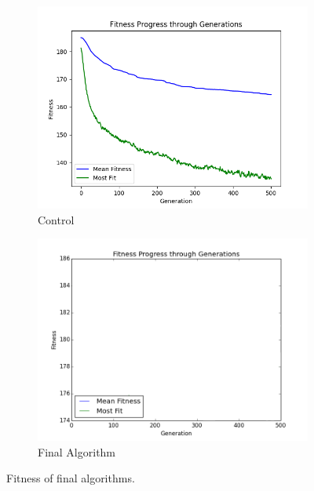 \documentclass{article}
\begin{document}
\begin{figure}[ht]
\centering
\begin{subfigure}{0.5\textwidth}
\centering
\includegraphics[width=1\textwidth]{Figures/control_fitness}
\caption{Control}
\label{fig:control_fitness}
\end{subfigure}%
\begin{subfigure}{0.5\textwidth}
\centering
\includegraphics[width=1\textwidth]{Figures/final_fitness}
\caption{Final Algorithm}
\label{fig:final_fitness}
\end{subfigure}

\caption{Fitness of final algorithms.}
\label{fig:fitness_comparison}
\end{figure}
\end{document}
